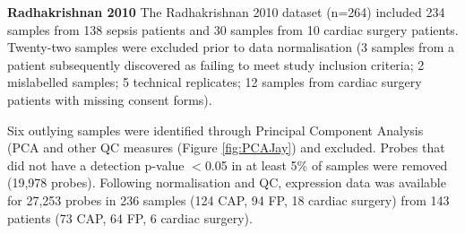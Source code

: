 \textbf{Radhakrishnan 2010}
The Radhakrishnan 2010 dataset (n=264) \parencite{Radhakrishnan2012} included 234 samples from 138 sepsis patients and 30 samples from 10 cardiac surgery patients. Twenty-two samples were excluded prior to data normalisation (3 samples from a patient subsequently discovered as failing to meet study inclusion criteria; 2 mislabelled samples; 5 technical replicates; 12 samples from cardiac surgery patients with missing consent forms). 

Six outlying samples were identified through Principal Component Analysis (PCA and other QC measures (Figure \ref{fig:PCAJay}) and excluded. Probes that did not have a detection p-value $<$0.05 in at least 5\% of samples were removed (19,978 probes). Following normalisation and QC, expression data was available for 27,253 probes in 236 samples (124 CAP, 94 FP, 18 cardiac surgery) from 143 patients (73 CAP, 64 FP, 6 cardiac surgery).

